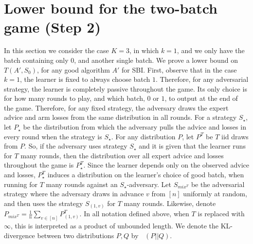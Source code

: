 \documentclass[a4paper,11pt]{article}
\theoremstyle{definition}
\newcommand{\KL}{\mathop{D_{\mathrm{KL}}}\limits}
\begin{document}
\section{Lower bound for the two-batch game (Step 2)} \label{sec:two-batch-step2}
In this section we consider the case $K=3$, in which $k=1$, and we only have the batch containing only $0$, and another single batch. We prove a lower bound on $T(A', S_0)$, for any good algorithm $A'$ for SBI.
First, observe that in the case $k=1$, the learner is fixed to always choose batch $1$.
Therefore, for any adversarial strategy, the learner is completely passive throughout the game. Its only choice is for how many rounds to play, and which batch, $0$ or $1$, to output at the end of the game. Therefore, for any fixed strategy, the adversary draws the expert advice and arm losses from the same distribution in all rounds. For a strategy $S_\star$, let $P_\star$ be the distribution from which the adversary pulls the advice and losses in every round when the strategy is $S_\star$.
For any distribution $P$, let $P^T$ be $T$ iid draws from $P$.
So, if the adversary uses strategy $S_\star$ and it is given that the learner runs for $T$ many rounds, then the distribution over all expert advice and losses throughout the game is $P_{\star}^T$.
Since the learner depends only on the observed advice and losses, $P_{\star}^T$ induces a distribution on the learner's choice of good batch, when running for $T$ many rounds against an $S_\star$-adversary.
Let $S_{mix^T}$ be the adversarial strategy where the adversary draws in advance $v$ from $[n]$ uniformly at random, and then uses the strategy $S_{(1,v)}$ for $T$ many rounds. 
Likewise, denote $P_{mix^T} = \frac{1}{n} \sum_{v \in [n]} P_{(1,v)}^T$.
In all notation defined above, when $T$ is replaced with $\infty$, this is interpreted as a product of unbounded length. We denote the KL-divergence between two distributions $P,Q$ by $\KL(P || Q)$.
\end{document}
